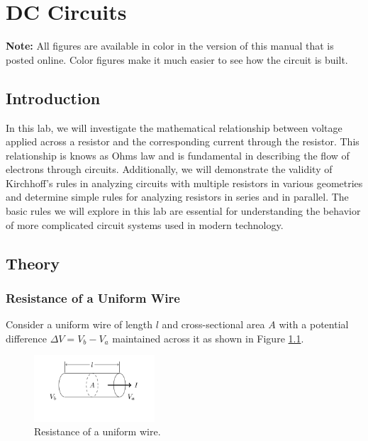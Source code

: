 \chapter{DC Circuits}

\textbf{Note:} All figures are available in color in the version of this manual that is posted online. Color figures make it much easier to see how the circuit is built.

\section{Introduction}

In this lab, we will investigate the mathematical relationship between voltage applied across a resistor and the corresponding current through the resistor. This relationship is knows as Ohms law and is fundamental in describing the flow of electrons through circuits. Additionally, we will demonstrate the validity of Kirchhoff's rules in analyzing circuits with multiple resistors in various geometries and determine simple rules for analyzing resistors in series and in parallel. The basic rules we will explore in this lab are essential for understanding the behavior of more complicated circuit systems used in modern technology.

\section{Theory}
\subsection{Resistance of a Uniform Wire}

Consider a uniform wire of length $l$ and cross-sectional area $A$ with a potential difference $\Delta V = V_b - V_a$ maintained across it as shown in Figure \ref{fig:cross-sec}.\myskip

\begin{figure}[h]
\centering
\includegraphics[width=0.4\textwidth]{./Exp2/pic/wireresistance.png}
\caption{Resistance of a uniform wire.}
\label{fig:cross-sec}
\end{figure}

